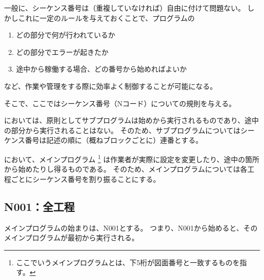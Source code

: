 


一般に、シーケンス番号は（重複していなければ）自由に付けて問題ない。
しかしこれに一定のルールを与えておくことで、プログラムの
\begin{enumerate}
\item どの部分で何が行われているか
\item どの部分でエラーが起きたか
\item 途中から稼働する場合、どの番号から始めればよいか
\end{enumerate}
など、作業や管理をする際に効率よく制御することが可能になる。

そこで、ここではシーケンス番号（Nコード）についての規則を与える。


\DMname においては、原則としてサブプログラムは始めから実行されるものであり、途中の部分から実行されることはない。
そのため、サブプログラムについてはシーケンス番号は記述の順に（概ねブロックごとに）連番とする。


\clearpage
\DMname において、メインプログラム
\footnote{ここでいうメインプログラムとは、下5桁が図面番号と一致するものを指す。}
は作業者が実際に設定を変更したり、途中の箇所から始めたりし得るものである。
そのため、メインプログラムについては各工程ごとにシーケンス番号を割り振ることにする。


\subsection{N001：全工程}
メインプログラムの始まりは、N001とする。
つまり、N001から始めると、そのメインプログラムが最初から実行される。


